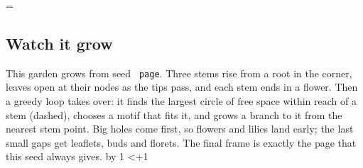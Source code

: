 \documentclass[11pt,a4paper]{article}
\begin{document}
\animk=\animfrom\relax
\loop
\setcounter{page}{1}\setcounter{section}{3}\setcounter{subsection}{2}
\florilegiumframe[\animexplain]{\the\animk}{\animframes}
\subsection{Watch it grow}

This garden grows from seed \texttt{\ifx\florilegiumseed\empty
page\else\florilegiumseed\fi}.
Three stems rise from a root in the corner, leaves open at their
nodes as the tips pass,
and each stem ends in a flower. Then a greedy loop takes over: it
finds the largest
circle of free space within reach of a
stem\ifx\animexplain\empty\else{} (dashed)\fi,
chooses a motif that fits it, and grows a branch to it from the
nearest stem point. Big
holes come first, so flowers and lilies land early; the last small
gaps get leaflets,
buds and florets. The final frame is exactly the page that this seed
always gives.
\florilegiumtextend
\clearpage
\advance\animk by 1
\ifnum\animk<\numexpr\animto+1\relax\repeat
\end{document}
